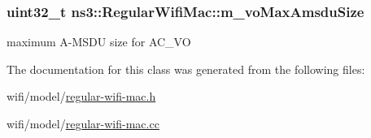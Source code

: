 \subsubsection[{\texorpdfstring{m\+\_\+vo\+Max\+Amsdu\+Size}{m_voMaxAmsduSize}}]{\setlength{\rightskip}{0pt plus 5cm}uint32\+\_\+t ns3\+::\+Regular\+Wifi\+Mac\+::m\+\_\+vo\+Max\+Amsdu\+Size\hspace{0.3cm}{\ttfamily [private]}}\hypertarget{classns3_1_1RegularWifiMac_a1c19226e2c71d1409f3373aa9ed97a3f}{}\label{classns3_1_1RegularWifiMac_a1c19226e2c71d1409f3373aa9ed97a3f}


maximum A-\/\+M\+S\+DU size for A\+C\+\_\+\+VO 



The documentation for this class was generated from the following files\+:\begin{DoxyCompactItemize}
\item 
wifi/model/\hyperlink{regular-wifi-mac_8h}{regular-\/wifi-\/mac.\+h}\item 
wifi/model/\hyperlink{regular-wifi-mac_8cc}{regular-\/wifi-\/mac.\+cc}\end{DoxyCompactItemize}
